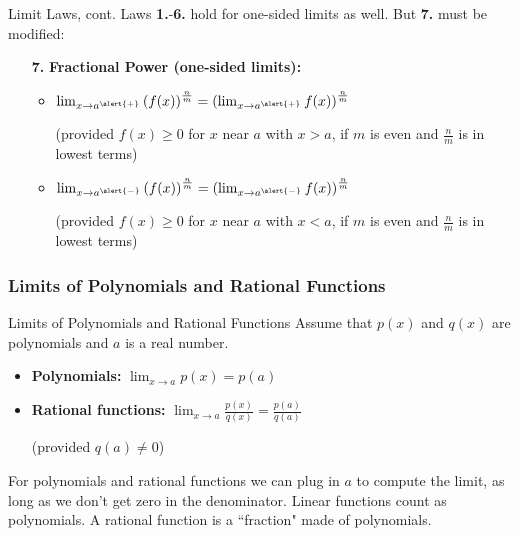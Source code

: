 \documentclass[cal1spr16Lectures.tex]{subfiles}
\begin{document}
\begin{frame}{\small Limit Laws, cont.}\footnotesize
Laws {\bf 1.}-{\bf 6.} hold for one-sided limits as well.  But {\bf 7.} must be modified:

\begin{itemize}
\item[{\bf 7.}] {\bf Fractional Power (one-sided limits):} 
	\begin{itemize}
	\item $\lim_{x \to a^{\alert{+}}}\left(f(x)\right)^{\frac{n}{m}} = \left( \lim_{x \to a^{\alert{+}}} f(x) \right)^{\frac{n}{m}}$

	\vspace{0.25pc}
	(provided $f(x) \ge 0$ for $x$ near $a$ \alert{with $x>a$}, if $m$ is even and $\textstyle\frac{n}{m}$ is in lowest terms)
	
	\vspace{0.75pc}
	\item $\lim_{x \to a^{\alert{-}}}\left(f(x)\right)^{\frac{n}{m}} = \left( \lim_{x \to a^{\alert{-}}} f(x) \right)^{\frac{n}{m}}$ 
	
	\vspace{0.25pc}
	(provided $f(x) \ge 0$ for $x$ near $a$ \alert{with $x<a$}, if $m$ is even and $\textstyle\frac{n}{m}$ is in lowest terms)
	\end{itemize}
\end{itemize}
\end{frame}

\subsubsection{Limits of Polynomials and Rational Functions}
\begin{frame}{\small Limits of Polynomials and Rational Functions}{}\footnotesize
Assume that $p(x)$ and $q(x)$ are polynomials and $a$ is a real number.

\vspace{0.6pc}
\begin{itemize}
\item {\bf Polynomials:}  $\lim_{x \to a} p(x) = p(a)$

\vspace{0.4pc}
\item {\bf Rational functions:}  $\lim_{x \to a} \frac{p(x)}{q(x)} = \frac{p(a)}{q(a)}$ 

\vspace{0.1pc}
(provided $q(a) \ne 0$)
\end{itemize}

\vspace{0.6pc} 
For polynomials and rational functions we can plug in $a$ to compute the limit, as long as we don't get zero in the denominator.  Linear functions count as polynomials.  A rational function is a ``fraction" made of polynomials.
\end{frame}
\end{document}
